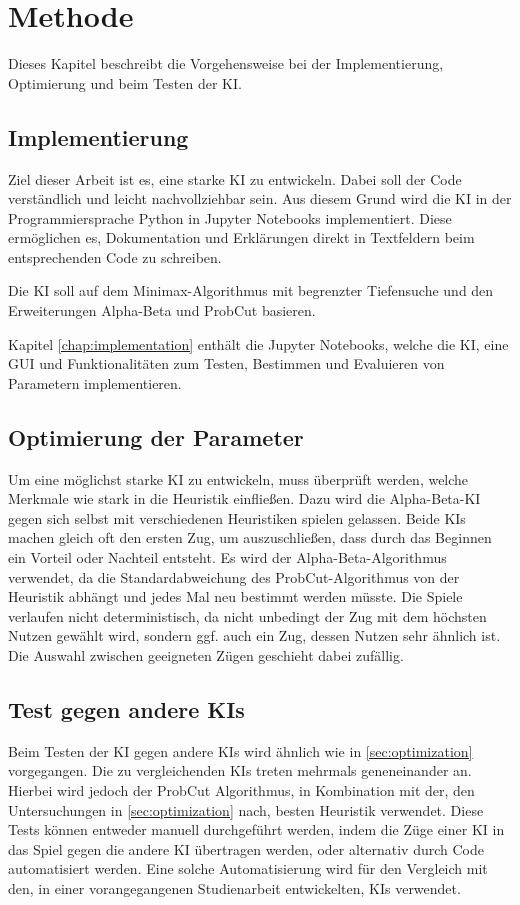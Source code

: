 
\chapter{Methode}
\label{chap:methode}

Dieses Kapitel beschreibt die Vorgehensweise bei der Implementierung, Optimierung und beim Testen der \ac{KI}.

\section{Implementierung}
Ziel dieser Arbeit ist es, eine starke \ac{KI} zu entwickeln. Dabei soll der Code verständlich und leicht nachvollziehbar
sein. Aus diesem Grund wird die \ac{KI} in der Programmiersprache Python in Jupyter Notebooks implementiert. Diese
ermöglichen es, Dokumentation und Erklärungen direkt in Textfeldern beim entsprechenden Code zu schreiben.

Die \ac{KI} soll auf dem Minimax-Algorithmus mit begrenzter Tiefensuche und den Erweiterungen Alpha-Beta und ProbCut
basieren.

Kapitel \ref{chap:implementation} enthält die Jupyter Notebooks, welche die \ac{KI}, eine \ac{GUI}
und Funktionalitäten zum Testen, Bestimmen und Evaluieren von Parametern implementieren.

\section{Optimierung der Parameter}
\label{sec:optimization}
Um eine möglichst starke \ac{KI} zu entwickeln, muss überprüft werden, welche Merkmale wie stark in die Heuristik einfließen.
Dazu wird die Alpha-Beta-\ac{KI} gegen sich selbst mit verschiedenen Heuristiken spielen gelassen. Beide \acp{KI} machen gleich
oft den ersten Zug, um auszuschließen, dass durch das Beginnen ein Vorteil oder Nachteil entsteht. Es wird der
Alpha-Beta-Algorithmus verwendet, da die Standardabweichung des ProbCut-Algorithmus von der Heuristik abhängt und jedes
Mal neu bestimmt werden müsste. Die Spiele verlaufen nicht deterministisch, da nicht unbedingt der Zug mit dem höchsten
Nutzen gewählt wird, sondern ggf. auch ein Zug, dessen Nutzen sehr ähnlich ist. Die Auswahl zwischen geeigneten Zügen geschieht dabei zufällig.

\section{Test gegen andere KIs}
Beim Testen der \ac{KI} gegen andere \acp{KI} wird ähnlich wie in \autoref{sec:optimization} vorgegangen. Die zu vergleichenden
\acp{KI} treten mehrmals geneneinander an. Hierbei wird jedoch der ProbCut Algorithmus, in Kombination mit der, den
Untersuchungen in \autoref{sec:optimization} nach, besten Heuristik verwendet. Diese Tests können entweder manuell
durchgeführt werden, indem die Züge einer \ac{KI} in das Spiel gegen die andere \ac{KI} übertragen werden, oder alternativ
durch Code automatisiert werden. Eine solche Automatisierung wird für den Vergleich mit den, in einer vorangegangenen
Studienarbeit entwickelten, \acp{KI} verwendet.

